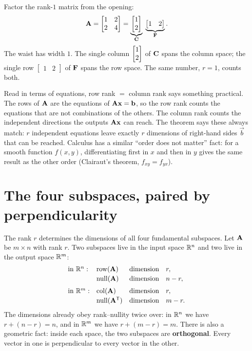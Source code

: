 \begin{example}\label{ch16:rankfac-num}
Factor the rank-$1$ matrix from the opening:
\[
  \mathbf{A} = \begin{bmatrix} 1 & 2 \\ 2 & 4 \end{bmatrix}
  = \underbrace{\begin{bmatrix}1 \\ 2\end{bmatrix}}_{\mathbf{C}}\;
    \underbrace{\begin{bmatrix} 1 & 2 \end{bmatrix}}_{\mathbf{F}}.
\]
The waist has width $1$. The single column $\begin{bmatrix}1\\2\end{bmatrix}$ of $\mathbf{C}$ spans the
column space; the single row $\begin{bmatrix}1 & 2\end{bmatrix}$ of $\mathbf{F}$ spans
the row space. The same number, $r=1$, counts both.
\end{example}

\begin{connectionbox}
Read in terms of equations, row rank $=$ column rank says something practical.
The rows of $\mathbf{A}$ are the equations of $\mathbf{A}\mathbf{x}=\mathbf{b}$, so the row
rank counts the equations that are not combinations of the others. The column
rank counts the independent directions the outputs $\mathbf{A}\mathbf{x}$ can reach.
The theorem says these always match: $r$ independent equations leave exactly $r$
dimensions of right-hand sides $\vec{b}$ that can be reached. Calculus has a
similar ``order does not matter'' fact: for a smooth function $f(x,y)$,
differentiating first in $x$ and then in $y$ gives the same result as the other
order (Clairaut's theorem, $f_{xy} = f_{yx}$).
\end{connectionbox}

\section{The four subspaces, paired by perpendicularity}

The rank $r$ determines the dimensions of all four fundamental subspaces.
Let $\mathbf{A}$ be $m\times n$ with rank $r$. Two subspaces live in the input space
$\mathbb{R}^n$ and two live in the output space $\mathbb{R}^m$:
\[
  \begin{array}{llcl}
  \text{in } \mathbb{R}^n: & \operatorname{row}(\mathbf{A}) & \text{dimension} & r,\\[2pt]
                   & \operatorname{null}(\mathbf{A}) & \text{dimension} & n-r,\\[6pt]
  \text{in } \mathbb{R}^m: & \operatorname{col}(\mathbf{A}) & \text{dimension} & r,\\[2pt]
                   & \operatorname{null}(\mathbf{A}^{\mathsf{T}}) & \text{dimension} & m-r.
  \end{array}
\]
The dimensions already obey rank--nullity twice over: in $\mathbb{R}^n$ we have
$r + (n-r) = n$, and in $\mathbb{R}^m$ we have $r + (m-r) = m$. There is also a
geometric fact: inside each space, the two subspaces are
\textbf{orthogonal}. Every vector in one is perpendicular to every vector in
the other.

